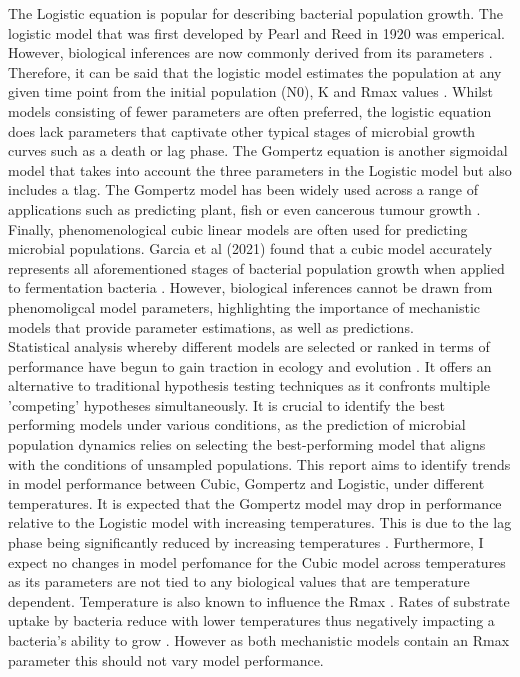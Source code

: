 \documentclass[11pt]{article}
\begin{document}
The Logistic equation is popular for describing bacterial population growth. The logistic model that was first developed by Pearl and Reed in 1920 was emperical. However, biological inferences are now commonly derived from its parameters \cite{WACHENHEIM2003157} \cite{Pearl1920}. Therefore, it can be said that the logistic model estimates the population at any given time point from the initial population (N0), K and Rmax values \cite{WACHENHEIM2003157}. Whilst models consisting of fewer parameters are often preferred, the logistic equation does lack parameters that captivate other typical stages of microbial growth curves such as a death or lag phase. The Gompertz equation is another sigmoidal model that takes into account the three parameters in the Logistic model but also includes a tlag. The Gompertz model has been widely used across a range of applications such as predicting plant, fish or even cancerous tumour growth \cite{Tjrve2017}. Finally, phenomenological cubic linear models are often used for predicting microbial populations. Garcia et al (2021) found that a cubic model accurately represents all aforementioned stages of bacterial population growth when applied to fermentation bacteria \cite{Garcia2021}. However, biological inferences cannot be drawn from phenomoligcal model parameters, highlighting the importance of mechanistic models that provide parameter estimations, as well as predictions.\\

Statistical analysis whereby different models are selected or ranked in terms of performance have begun to gain traction in ecology and evolution \cite{JOHNSON2004101}. It offers an alternative to traditional hypothesis testing techniques as it confronts multiple 'competing' hypotheses simultaneously. It is crucial to identify the best performing models under various conditions, as the prediction of microbial population dynamics relies on selecting the best-performing model that aligns with the conditions of unsampled populations. This report aims to identify trends in model performance between Cubic, Gompertz and Logistic, under different temperatures. It is expected that the Gompertz model may drop in performance relative to the Logistic model with increasing temperatures. This is due to the lag phase being significantly reduced by increasing temperatures \cite{ABA2021109108}. Furthermore, I expect no changes in model perfomance for the Cubic model across temperatures as its parameters are not tied to any biological values that are temperature dependent. Temperature is also known to influence the Rmax\cite{Ward1972} \cite{Dey2020}. Rates of substrate uptake by bacteria reduce with lower temperatures thus negatively impacting a bacteria's ability to grow \cite{Nedwell1994}. However as both mechanistic models contain an Rmax parameter this should not vary model performance.\\
\end{document}
